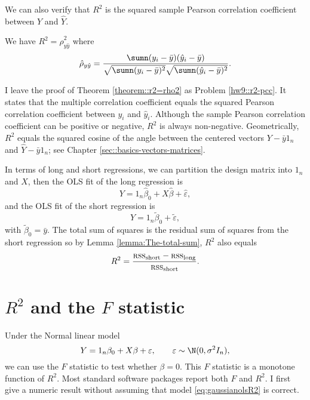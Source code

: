 We can also verify that $R^{2}$ is the squared sample Pearson correlation
coefficient between $Y$ and $\hat{Y}$. 
\begin{theorem}\label{theorem::r2=rho2}
We have $R^{2}= \hat{\rho}_{y\hat{y}}^2$ where
\begin{equation}
\hat{\rho}_{y\hat{y}}
= \frac{\sumn(y_{i}-\bar{y})(\hat{y}_{i}-\bar{y})}{\sqrt{\sumn(y_{i}-\bar{y})^{2}}\sqrt{\sumn(\hat{y}_{i}-\bar{y})^{2}}} .
\label{eq:r2PCC}
\end{equation}
\end{theorem}

I leave the proof of Theorem \ref{theorem::r2=rho2} as Problem \ref{hw9::r2-pcc}.  It states that the multiple correlation coefficient equals the squared Pearson correlation coefficient between $y_i$ and $\hat{y}_i$. 
Although the sample Pearson correlation coefficient can be positive or negative, $R^2$ is always non-negative.  
Geometrically, $R^2$ equals the squared cosine of the angle between the centered vectors $Y-\bar{y} 1_n$ and $\hat{Y} - \bar{y} 1_n$; see Chapter \ref{sec::basics-vectors-matrices}. 


 

In terms of long and short regressions, we can partition the design matrix into   $ 1_{n}$ and $X$, then the OLS fit of the long regression is
\begin{equation}
Y=1_{n}\hat{\beta}_0+X \hat{\beta} +\hat{\varepsilon},\label{eq:longregR2}
\end{equation}
 and the OLS fit of the short regression is
\begin{equation}
Y=1_{n}\tilde{\beta}_0 +\tilde{\varepsilon},\label{eq:shortregR2}
\end{equation}
with $\tilde{\beta}_0 =\bar{y}$.
The total sum of squares is the residual sum of squares from the short
regression so by Lemma \ref{lemma:The-total-sum}, $R^{2}$ also equals 
\begin{equation}
R^{2}  =  \frac{\textsc{rss}_{\text{short}}-\textsc{rss}_{\text{long}}}{\textsc{rss}_{\text{short}}} . \label{eq::residuals-R2} 
\end{equation}





\section{$R^{2}$ and the $F$ statistic}

Under the Normal linear model 
\begin{equation}
Y=1_{n}\beta_0+X \beta +\varepsilon,\qquad\varepsilon\sim\N(0,\sigma^{2}I_{n}),\label{eq:gaussianolsR2}
\end{equation}
we can use the $F$ statistic to test whether $\beta =0$. This
$F$ statistic is a monotone function of $R^{2}$. Most standard software
packages report both $F$ and $R^2$. I first give a numeric result without assuming that model \eqref{eq:gaussianolsR2} is correct. 

